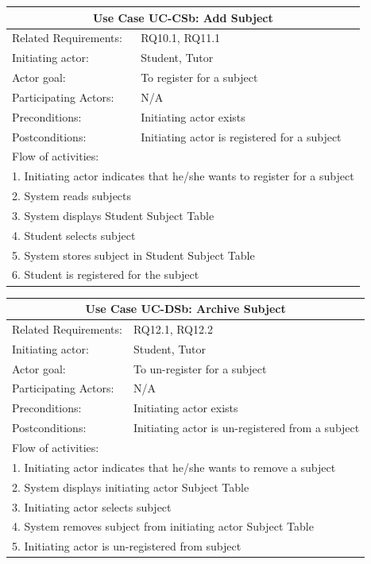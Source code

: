 \documentclass[12pt]{article}
\begin{document}
		\begin{tabular}{| l | p{10cm}| }
			\hline\multicolumn{2}{|c|}{ \textbf{Use Case UC-CSb: Add Subject}} \\ \hline
			Related Requirements: & RQ10.1, RQ11.1  \\ \hline
			Initiating actor: & Student, Tutor \\ \hline
			Actor goal: & To register for a subject\\ \hline
			Participating Actors: &N/A\\ \hline
			Preconditions: &Initiating actor exists\\ \hline
			Postconditions: & Initiating actor is registered for a subject\\ \hline
			\multicolumn{2}{|l|}{Flow of activities:}\\ \hline
			\multicolumn{2}{|p{15cm}|}{1. Initiating actor indicates that he/she wants to register for a subject}\\
			\multicolumn{2}{|p{15cm}|}{2. System reads subjects}\\
			\multicolumn{2}{|p{15cm}|}{3. System displays Student Subject Table}\\
			\multicolumn{2}{|l|}{4. Student selects subject}\\
			\multicolumn{2}{|l|}{5. System stores subject in Student Subject Table}\\
			\multicolumn{2}{|l|}{6. Student is registered for the subject}\\
			 \hline
		\end{tabular}

		\begin{tabular}{| l | p{10cm}| }
			\hline\multicolumn{2}{|c|}{ \textbf{Use Case UC-DSb: Archive Subject} }\\ \hline
			Related Requirements: & RQ12.1, RQ12.2  \\ \hline
			Initiating actor: & Student, Tutor \\ \hline
			Actor goal: & To un-register for a subject\\ \hline
			Participating Actors: &N/A\\ \hline
			Preconditions: &Initiating actor exists\\ \hline
			Postconditions: & Initiating actor is un-registered from a subject\\ \hline
			\multicolumn{2}{|l|}{Flow of activities:}\\ \hline
			\multicolumn{2}{|p{15cm}|}{1. Initiating actor indicates that he/she wants to remove a subject}\\
			\multicolumn{2}{|p{15cm}|}{2. System displays initiating actor Subject Table}\\
			\multicolumn{2}{|l|}{3. Initiating actor selects subject}\\
			\multicolumn{2}{|l|}{4. System removes subject from initiating actor Subject Table}\\
			\multicolumn{2}{|l|}{5. Initiating actor is un-registered from subject}\\
			 \hline
		\end{tabular}
\end{document}
